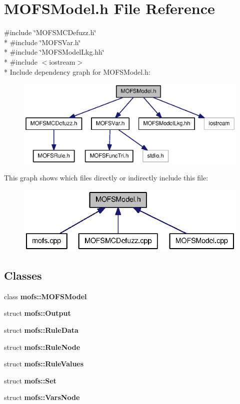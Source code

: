 \section{M\-O\-F\-S\-Model.\-h File Reference}
\label{MOFSModel_8h}
{\ttfamily \#include \char`\"{}M\-O\-F\-S\-M\-C\-Defuzz.\-h\char`\"{}}\\*
{\ttfamily \#include \char`\"{}M\-O\-F\-S\-Var.\-h\char`\"{}}\\*
{\ttfamily \#include \char`\"{}M\-O\-F\-S\-Model\-Lkg.\-hh\char`\"{}}\\*
{\ttfamily \#include $<$iostream$>$}\\*
Include dependency graph for M\-O\-F\-S\-Model.\-h\-:\nopagebreak
\begin{figure}[H]
\begin{center}
\leavevmode
\includegraphics[width=350pt]{MOFSModel_8h__incl}
\end{center}
\end{figure}
This graph shows which files directly or indirectly include this file\-:\nopagebreak
\begin{figure}[H]
\begin{center}
\leavevmode
\includegraphics[width=336pt]{MOFSModel_8h__dep__incl}
\end{center}
\end{figure}
\subsection*{Classes}
\begin{DoxyCompactItemize}
\item 
class {\bf mofs\-::\-M\-O\-F\-S\-Model}
\item 
struct {\bf mofs\-::\-Output}
\item 
struct {\bf mofs\-::\-Rule\-Data}
\item 
struct {\bf mofs\-::\-Rule\-Node}
\item 
struct {\bf mofs\-::\-Rule\-Values}
\item 
struct {\bf mofs\-::\-Set}
\item 
struct {\bf mofs\-::\-Vars\-Node}
\end{DoxyCompactItemize}
